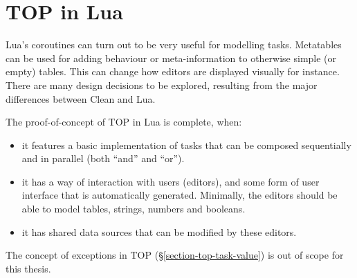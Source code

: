 \section{TOP in Lua}\label{section-top-lua}
Lua's coroutines can turn out to be very useful for modelling tasks. Metatables can be used for adding behaviour or meta-information to otherwise simple (or empty) tables. This can change how editors are displayed visually for instance. There are many design decisions to be explored, resulting from the major differences between Clean and Lua.

The proof-of-concept of TOP in Lua is complete, when:
\begin{itemize}
    \item it features a basic implementation of tasks that can be composed sequentially and in parallel (both ``and'' and ``or'').
    \item it has a way of interaction with users (editors), and some form of user interface that is automatically generated. Minimally, the editors should be able to model tables, strings, numbers and booleans.
    \item it has shared data sources that can be modified by these editors.
\end{itemize}

The concept of exceptions in TOP (\S \ref{section-top-task-value}) is out of scope for this thesis.
